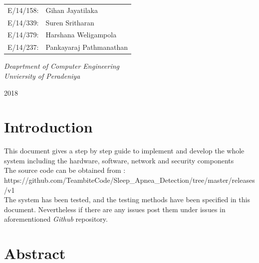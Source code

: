 \documentclass{report}
\begin{document}
\begin{titlepage}
	{\scshape\Large \begin{tabular}{c l}
	     E/14/158: &Gihan Jayatilaka\\E/14/339: &Suren Sritharan\\E/14/379:& Harshana Weligampola\\E/14/237: &Pankayaraj Pathmanathan\\
	\end{tabular} } %
	
	\vspace{0.5\baselineskip} %
	
	\textit{Deaprtment of Computer Engineering \\ Unviersity of Peradeniya} %
	
	\vfill %
	
	
	
	\vspace{0.3\baselineskip} %
	
	2018 %
	
\end{titlepage}


\clearpage
\tableofcontents
\clearpage

\chapter{Introduction}

This document gives a step by step guide to implement and develop the whole system including the hardware, software, network and security components\\
The source code can be obtained from : \\

https://github.com/TeambiteCode/Sleep\_Apnea\_Detection/tree/master/releases/v1\\


The system has been tested, and the testing methods have been specified in this document. Nevertheless if there are any issues post them under issues in aforementioned \emph{Github} repository.



\chapter{Abstract}
\end{document}

